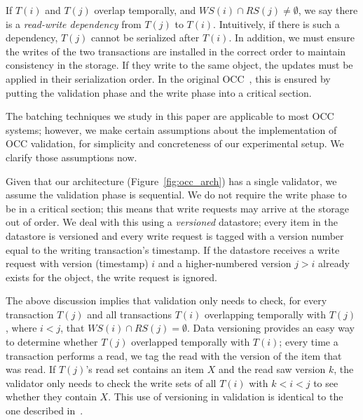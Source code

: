 If $T(i)$ and $T(j)$ overlap temporally, and $WS(i) \cap RS(j) \neq \emptyset$, we say there is a \emph{read-write dependency} from $T(j)$ to $T(i)$. Intuitively, if there is such a dependency, $T(j)$ cannot be serialized after $T(i)$. In addition, we must ensure the writes of the two transactions are installed in the correct order to maintain consistency in the storage. If they write to the same object, the updates must be applied in their serialization order. In the original OCC~\cite{kung81tods}, this is ensured by putting the validation phase and the write phase into a critical section.

The batching techniques we study in this paper are applicable to most OCC systems; however, we make certain assumptions about the implementation of OCC validation, for simplicity and concreteness of our experimental setup. We clarify those assumptions now.

Given that our architecture (Figure~\ref{fig:occ_arch}) has a single validator, we assume the validation phase is sequential. We do not require the write phase to be in a critical section; this means that write requests may arrive at the storage out of order. We deal with this using a \emph{versioned} datastore; every item in the datastore is versioned and every write request is tagged with a version number equal to the writing transaction's timestamp. If the datastore receives a write request with version (timestamp) $i$ and a higher-numbered version $j > i$ already exists for the object, the write request is ignored. 

The above discussion implies that validation only needs to check, for every transaction $T(j)$ and all transactions $T(i)$ overlapping temporally with $T(j)$, where $i<j$, that $WS(i) \cap RS(j) = \emptyset$. Data versioning provides an easy way to determine whether $T(j)$ overlapped temporally with $T(i)$; every time a transaction performs a read, we tag the read with the version of the item that was read. If $T(j)$'s read set contains an item $X$ and the read saw version $k$, the validator only needs to check the write sets of all $T(i)$ with $k < i < j$ to see whether they contain $X$. This use of versioning in validation is identical to the one described in~\cite{ding2015centiman}.
